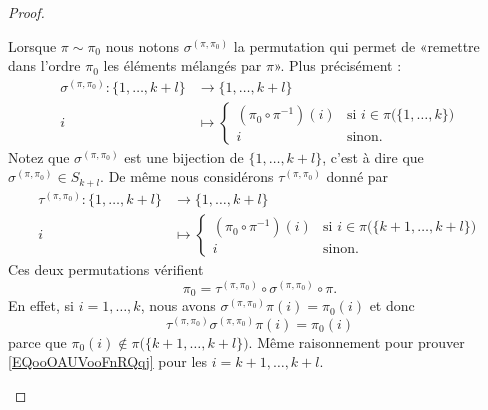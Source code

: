 \begin{proof}
\begin{subproof}
		Lorsque \( \pi\sim\pi_0\) nous notons \( \sigma^{(\pi,\pi_0)}\) la permutation qui permet de «remettre dans l'ordre \( \pi_0\) les éléments mélangés par \( \pi\)». Plus précisément :
		\begin{equation}		\label{EQooMKNVooNbbNwk}
			\begin{aligned}
				\sigma^{(\pi,\pi_0)}\colon \{ 1,\ldots,k+l \} & \to \{ 1,\ldots,k+l \}                                                           \\
				i                                             & \mapsto \begin{cases}
					                                                        (\pi_0\circ\pi^{-1})(i) & \text{si } i\in\pi\big( \{ 1,\ldots,k \} \big) \\
					                                                        i                       & \text{sinon.}
				                                                        \end{cases}
			\end{aligned}
		\end{equation}
		Notez que \( \sigma^{(\pi,\pi_0)}\) est une bijection de \( \{ 1,\ldots,k+l \}\), c'est à dire que \( \sigma^{(\pi,\pi_0)}\in S_{k+l}\). De même nous considérons \( \tau^{(\pi,\pi_0)}\) donné par
		\begin{equation}
			\begin{aligned}
				\tau^{(\pi,\pi_0)}\colon \{ 1,\ldots,k+l \} & \to \{ 1,\ldots,k+l \}                                                               \\
				i                                           & \mapsto \begin{cases}
					                                                      (\pi_0\circ\pi^{-1})(i) & \text{si } i\in\pi\big( \{ k+1,\ldots,k+l \} \big) \\
					                                                      i                       & \text{sinon.}
				                                                      \end{cases}
			\end{aligned}
		\end{equation}
		Ces deux permutations vérifient
		\begin{equation}		\label{EQooOAUVooFnRQqj}
			\pi_0=\tau^{(\pi,\pi_0)}\circ\sigma^{(\pi,\pi_0)}\circ\pi.
		\end{equation}
		En effet, si \( i=1,\ldots,k\), nous avons \( \sigma^{(\pi,\pi_0)}\pi(i)=\pi_0(i)\) et donc
		\begin{equation}
			\tau^{(\pi,\pi_0)}\sigma^{(\pi,\pi_0)}\pi(i)=\pi_0(i)
		\end{equation}
		parce que \( \pi_0(i)\notin\pi\big( \{ k+1,\ldots,k+l \} \big)\). Même raisonnement pour prouver \eqref{EQooOAUVooFnRQqj} pour les \( i=k+1,\ldots,k+l\).


\end{subproof}
\end{proof}
